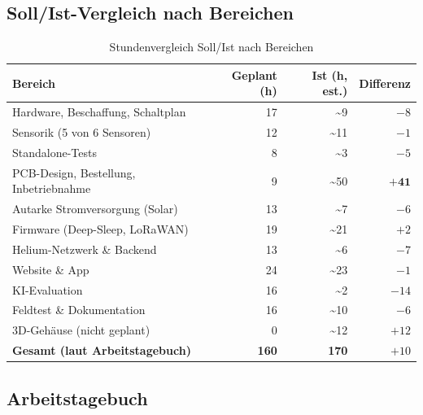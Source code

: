 \documentclass[11pt,a4paper]{scrartcl}
\begin{document}
\subsection*{Soll/Ist-Vergleich nach Bereichen}

\begin{table}[H]
  \centering
  \begin{tabularx}{\textwidth}{X r r r}
    \toprule
    \textbf{Bereich} & \textbf{Geplant (h)} & \textbf{Ist (h, est.)} & \textbf{Differenz} \\
    \midrule
    Hardware, Beschaffung, Schaltplan       & 17 & \textasciitilde9  & $-8$  \\
    Sensorik (5 von 6 Sensoren)             & 12 & \textasciitilde11 & $-1$  \\
    Standalone-Tests                         & 8  & \textasciitilde3  & $-5$  \\
    PCB-Design, Bestellung, Inbetriebnahme  & 9  & \textasciitilde50 & $\mathbf{+41}$ \\
    Autarke Stromversorgung (Solar)         & 13 & \textasciitilde7  & $-6$  \\
    Firmware (Deep-Sleep, LoRaWAN)          & 19 & \textasciitilde21 & $+2$  \\
    Helium-Netzwerk \& Backend              & 13 & \textasciitilde6  & $-7$  \\
    Website \& App                          & 24 & \textasciitilde23 & $-1$  \\
    KI-Evaluation                           & 16 & \textasciitilde2  & $-14$ \\
    Feldtest \& Dokumentation               & 16 & \textasciitilde10 & $-6$  \\
    3D-Gehäuse (nicht geplant)              & 0  & \textasciitilde12 & $+12$ \\
    \midrule
    \textbf{Gesamt (laut Arbeitstagebuch)}  & \textbf{160} & \textbf{170} & $+10$ \\
    \bottomrule
  \end{tabularx}
  \caption{Stundenvergleich Soll/Ist nach Bereichen}
\end{table}

\subsection*{Arbeitstagebuch}
\end{document}
